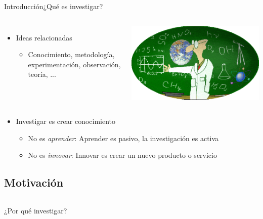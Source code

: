 \documentclass{beamer}
\begin{document}
\begin{frame}{Introducción}{¿Qué es investigar?}
	\begin{columns}
 		   \begin{itemize}
			\item Ideas relacionadas
	   			\begin{itemize}
				\item Conocimiento, metodología, experimentación, observación, teoría, ...
			    \end{itemize}
			\end{itemize}
  			\begin{center}
      		\includegraphics[width=1\textwidth]{figs/ciencia.png}
	    	\end{center}
		\end{columns}
	
    	\begin{itemize}
		\item \alert{Investigar es crear conocimiento}
  			\begin{itemize}
			\item No es \textit{aprender}: Aprender es pasivo, la investigación es activa
			\item No es \textit{innovar}: Innovar es crear un nuevo producto o servicio
   			\end{itemize}
    	\end{itemize}
\end{frame}

\subsection[Motivación]{Motivación}

\begin{frame}[plain]
	\begin{center}
	\begin{columns}
	\column{.6\textwidth}
	\begin{block}{}
	\begin{center}
	¿Por qué investigar?
	\end{center}
	\end{block}
	\end{columns}
	\end{center}
\end{frame}
\end{document}

